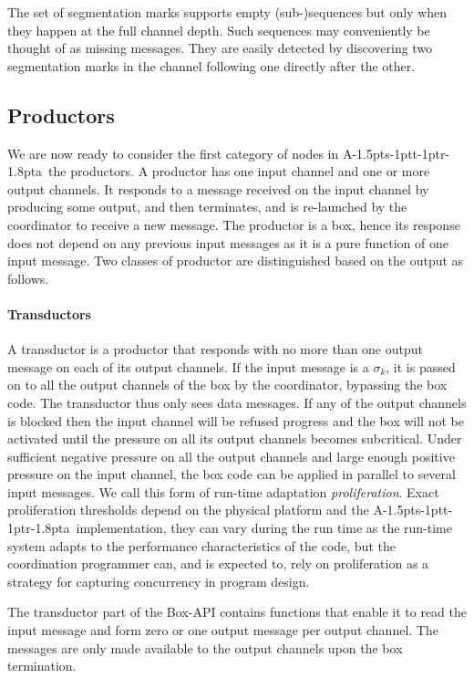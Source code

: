\documentclass[11pt]{report}
\def\ak{{\textsf{A\kern-1.5pts\kern-1ptt\kern-1ptr\kern-1.8pta}}\kern-2pt{\it K\kern-2ptahn}}
\begin{document}
The set of segmentation marks supports empty (sub-)sequences but only when they happen at the full channel depth. Such sequences
may conveniently be thought of as missing messages. They are easily detected by discovering two segmentation marks in the channel
following one directly after the other.

\subsection{Productors}

We are now ready to consider the first category of nodes in \ak\, the productors. A productor has one input channel and one or more output channels.
It responds to a message received on the input channel by producing some output, and then terminates, and is re-launched by the coordinator
to receive a new message. The productor is a box, hence its response does not depend on any previous input messages as it is a pure function
of one input message. Two classes of productor are distinguished based on the output as follows.

\paragraph{Transductors}
A transductor is a productor that responds with no more than one output message on each of its output channels. If the input message is a $\sigma_k$,
it is passed on to all the output channels of the box by the coordinator, bypassing the box code.
The transductor thus only sees data messages. If any of the output channels
is blocked then the input channel will be refused progress and the box will not be activated until the pressure on all its output channels becomes subcritical.
Under sufficient negative pressure on all the output channels and large enough positive pressure on the input channel, the box code can be applied
in parallel to several input messages. We call this form of run-time adaptation {\em proliferation}. Exact proliferation thresholds
depend on the physical platform and the \ak\ implementation, they can vary during the run time as the run-time system adapts
to the performance characteristics of the code, but the coordination programmer can, and is expected to, rely on proliferation
as a strategy for capturing concurrency in program design.

The transductor part of the Box-API contains functions that enable it to read the input message and form zero or one output message
per output channel. The messages are only made available to the output channels upon the box termination.
\end{document}
